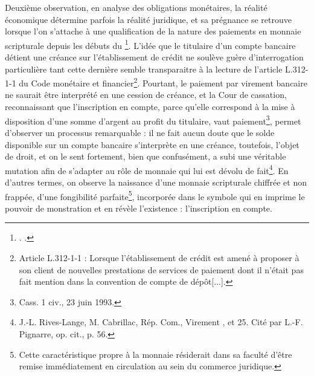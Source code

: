 {Deuxième observation, en analyse des obligations monétaires, la réalité économique détermine parfois la réalité juridique, et sa prégnance se retrouve lorsque l'on s'attache à une qualification de la nature des paiements en monnaie scripturale depuis les débuts du \footnote{. .}. L'idée que le titulaire d'un compte bancaire détient une créance sur l'établissement de crédit ne soulève guère d'interrogation particulière tant cette dernière semble transparaitre à la lecture de l'article L.312-1-1 du Code monétaire et financier\footnote{Article L.312-1-1 : \og Lorsque l'établissement de crédit est amené à proposer à son client de nouvelles prestations de services de paiement dont il n'était pas fait mention dans la convention de compte de dépôt[...]\fg{}.}. Pourtant, le paiement par virement bancaire ne saurait être interprété en une cession de créance, et la Cour de cassation, reconnaissant que l'inscription en compte, parce qu'elle correspond à la mise à disposition d'une somme d'argent au profit du titulaire, vaut paiement\footnote{Cass. 1 civ., 23 juin 1993.}, permet d'observer un processus remarquable : il ne fait aucun doute que le solde disponible sur un compte bancaire s'interprète en une créance, toutefois, l'objet de droit, et on le sent fortement, bien que confusément, a subi une véritable mutation afin de s'adapter au rôle de monnaie qui lui est dévolu de fait\footnote{J.-L. Rives-Lange, M. Cabrillac, Rép. Com., \og Virement \fg{},  et 25. Cité par L.-F. Pignarre, op. cit., p. 56.}. En d'autres termes, on observe la naissance d'une monnaie scripturale chiffrée et non frappée, d'une fongibilité parfaite\footnote{Cette caractéristique propre à la monnaie résiderait dans sa faculté d'être remise immédiatement en circulation au sein du commerce juridique.}, incorporée dans le symbole qui en imprime le pouvoir de monstration et en révèle l'existence : l'inscription en compte.\par

}
